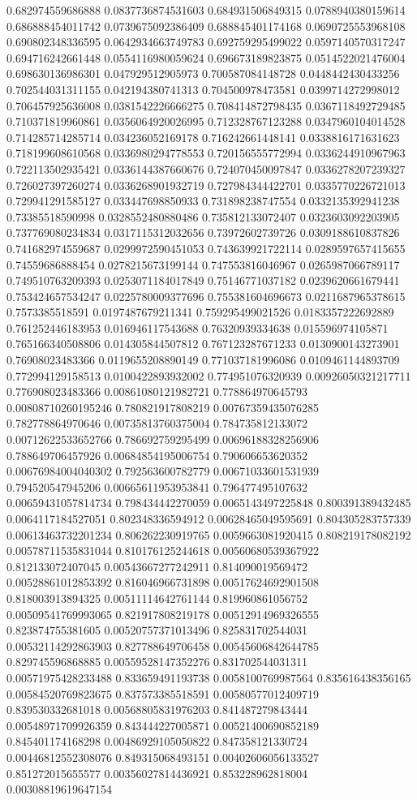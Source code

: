 \begin{table}
\begin{tabu}
\begin{sparkline}{10}
0.682974559686888 0.0837736874531603 0.684931506849315 0.0788940380159614 0.686888454011742 0.0739675092386409 0.688845401174168 0.0690725553968108 0.690802348336595 0.0642934663749783 0.692759295499022 0.0597140570317247 0.694716242661448 0.0554116980059624 0.696673189823875 0.0514522021476004 0.698630136986301 0.047929512905973 0.700587084148728 0.0448442430433256 0.702544031311155 0.042194380741313 0.704500978473581 0.0399714272998012 0.706457925636008 0.0381542226666275 0.708414872798435 0.0367118492729485 0.710371819960861 0.0356064920026995 0.712328767123288 0.0347960104014528 0.714285714285714 0.034236052169178 0.716242661448141 0.0338816171631623 0.718199608610568 0.0336980294778553 0.720156555772994 0.0336244910967963 0.722113502935421 0.0336144387660676 0.724070450097847 0.0336278207239327 0.726027397260274 0.0336268901932719 0.727984344422701 0.0335770226721013 0.729941291585127 0.033447698850933 0.731898238747554 0.0332135392941238 0.73385518590998 0.0328552480880486 0.735812133072407 0.0323603092203905 0.737769080234834 0.0317115312032656 0.73972602739726 0.0309188610837826 0.741682974559687 0.0299972590451053 0.743639921722114 0.0289597657415655 0.74559686888454 0.0278215673199144 0.747553816046967 0.0265987066789117 0.749510763209393 0.0253071184017849 0.75146771037182 0.0239620661679441 0.753424657534247 0.0225780009377696 0.755381604696673 0.0211687965378615 0.7573385518591 0.0197487679211341 0.759295499021526 0.0183357222692889 0.761252446183953 0.016946117543688 0.76320939334638 0.015596974105871 0.765166340508806 0.014305844507812 0.767123287671233 0.0130900143273901 0.76908023483366 0.0119655208890149 0.771037181996086 0.0109461144893709 0.772994129158513 0.0100422893932002 0.774951076320939 0.00926050321217711 0.776908023483366 0.00861080121982721 0.778864970645793 0.00808710260195246 0.780821917808219 0.00767359435076285 0.782778864970646 0.00735813760375004 0.784735812133072 0.00712622533652766 0.786692759295499 0.00696188328256906 0.788649706457926 0.00684854195006754 0.790606653620352 0.00676984004040302 0.792563600782779 0.00671033601531939 0.794520547945206 0.00665611953953841 0.796477495107632 0.00659431057814734 0.798434442270059 0.0065143497225848 0.800391389432485 0.0064117184527051 0.802348336594912 0.00628465049595691 0.804305283757339 0.00613463732201234 0.806262230919765 0.0059663081920415 0.808219178082192 0.00578711535831044 0.810176125244618 0.00560680539367922 0.812133072407045 0.00543667277242911 0.814090019569472 0.00528861012853392 0.816046966731898 0.00517624692901508 0.818003913894325 0.00511114642761144 0.819960861056752 0.00509541769993065 0.821917808219178 0.00512914969326555 0.823874755381605 0.00520757371013496 0.825831702544031 0.00532114292863903 0.827788649706458 0.00545606842644785 0.829745596868885 0.00559528147352276 0.831702544031311 0.00571975428233488 0.833659491193738 0.0058100769987564 0.835616438356165 0.00584520769823675 0.837573385518591 0.00580577012409719 0.839530332681018 0.00568805831976203 0.841487279843444 0.00548971709926359 0.843444227005871 0.00521400690852189 0.845401174168298 0.00486929105050822 0.847358121330724 0.00446812552308076 0.849315068493151 0.00402606056133527 0.851272015655577 0.00356027814436921 0.853228962818004 0.00308819619647154 
\end{sparkline}
\end{tabu}
\end{table}
